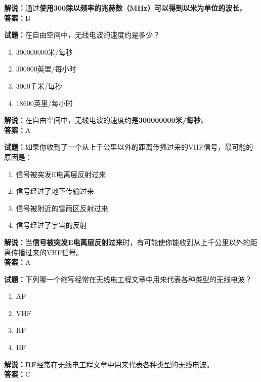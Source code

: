 \documentclass{ctexbook}
\begin{document}
\noindent\textbf{解说：}通过\textbf{使用300除以频率的兆赫数（\si{\MHz}）可以得到以米为单位的波长}。\\\noindent\textbf{答案：}B


\bigskip


\noindent\textbf{试题：}在自由空间中，无线电波的速度约是多少？

\begin{enumerate}[leftmargin=3em]
	\item 300000000米/每秒
	\item 300000英里/每小时
	\item 3000千米/每秒
	\item 18600英里/每小时
\end{enumerate}

\noindent\textbf{解说：}在自由空间中，无线电波的速度约是\textbf{300000000米/每秒}。\\\noindent\textbf{答案：}A


\bigskip


\noindent\textbf{试题：}如果你收到了一个从上千公里以外的距离传播过来的VHF信号，最可能的原因是：

\begin{enumerate}[leftmargin=3em]
	\item 信号被突发E电离层反射过来
	\item 信号经过了地下传输过来
	\item 信号被附近的雷雨区反射过来
	\item 信号经过了宇宙的反射
\end{enumerate}

\noindent\textbf{解说：}当\textbf{信号被突发E电离层反射过来}时，有可能使你能收到从上千公里以外的距离传播过来的VHF信号。\\\noindent\textbf{答案：}A


\bigskip


\noindent\textbf{试题：}下列哪一个缩写经常在无线电工程文章中用来代表各种类型的无线电波？

\begin{enumerate}[leftmargin=3em]
	\item AF
	\item VHF
	\item RF
	\item HF
\end{enumerate}

\noindent\textbf{解说：RF}经常在无线电工程文章中用来代表各种类型的无线电波。\\\noindent\textbf{答案：}C


\bigskip
\end{document}
